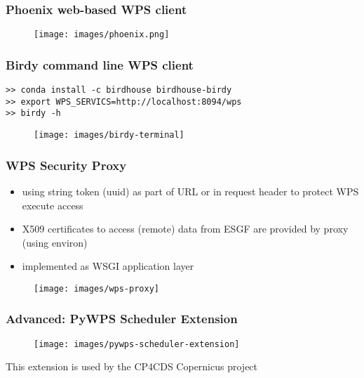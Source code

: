 \documentclass{beamer}
\begin{document}
\begin{frame}
  \frametitle<presentation>{Phoenix web-based WPS client}
  \begin{figure}
    \texttt{[image: images/phoenix.png]}
  \end{figure}
\end{frame}

\begin{frame}[fragile]
  \frametitle<presentation>{Birdy command line WPS client}
  \begin{verbatim}
>> conda install -c birdhouse birdhouse-birdy
>> export WPS_SERVICS=http://localhost:8094/wps
>> birdy -h
  \end{verbatim}
  \begin{figure}
    \texttt{[image: images/birdy-terminal]}
  \end{figure}
\end{frame}

\begin{frame}
  \frametitle{WPS Security Proxy}
  \begin{itemize}
    \item using string token (uuid) as part of URL or in request header to protect WPS execute access
    \item X509 certificates to access (remote) data from ESGF are provided by proxy (using environ)
    \item implemented as WSGI application layer
  \end{itemize}
  \begin{figure}
    \texttt{[image: images/wps-proxy]}
  \end{figure}
\end{frame}

\begin{frame}
\frametitle<presentation>{Advanced: PyWPS Scheduler Extension}

  \begin{figure}[ht]
    \centering
    \texttt{[image: images/pywps-scheduler-extension]}
  \end{figure}

  \centering
  \footnotesize{This extension is used by the CP4CDS Copernicus project}

\end{frame}
\end{document}
